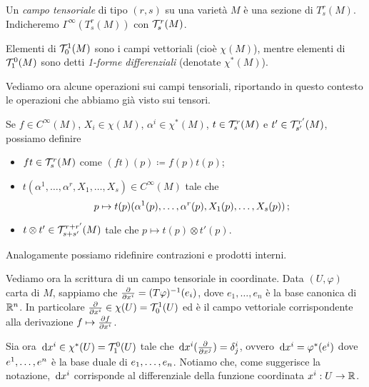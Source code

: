 \begin{definition} 
	Un \emph{campo tensoriale} di tipo $(r,s)$ su una varietà $M$ è una sezione di $T_s^r(M)$. Indicheremo $\Gamma^\infty(T_s^r(M))$ con $\Tau_s^r(M)$.
	
	Elementi di $\Tau_0^1(M)$ sono i campi vettoriali (cioè $\chi(M)$), mentre elementi di $\Tau_1^0(M)$ sono detti \emph{1-forme differenziali} (denotate $\chi^*(M)$). 
\end{definition}

Vediamo ora alcune operazioni sui campi tensoriali, riportando in questo contesto le operazioni che abbiamo già visto sui tensori. 

Se $f\in C^\infty(M)$, $X_i \in \chi(M)$, $\alpha^i \in \chi^*(M)$, $t \in \Tau_s^r(M)$ e $t' \in \Tau_{s'}^{r'}(M)$, possiamo definire
\begin{itemize}
	\item $ft \in \Tau_s^r(M)$ come $(ft)(p) \coloneqq f(p) t(p)$;
	\item $t(\alpha^1,\ldots,\alpha^r,X_1,\ldots, X_s)\in C^\infty(M)$ tale che
	\begin{equation*}
		p \mapsto t(p)(\alpha^1(p),\ldots,\alpha^r(p),X_1(p),\ldots, X_s(p)) \puntovirgola
	\end{equation*}
	
	\item $t\otimes t' \in \Tau_{s+s'}^{r+r'}(M)$ tale che $p \mapsto t(p)\otimes t'(p)$.
\end{itemize}
Analogamente possiamo ridefinire contrazioni e prodotti interni.

Vediamo ora la scrittura di un campo tensoriale in coordinate. Data $(U,\varphi)$ carta di $M$, sappiamo che $\DerParz{}{x^i} = (T\varphi)^{-1}(e_i)$, dove $e_1,\ldots, e_n$ è la base canonica di $\R^n$.
In particolare $\DerParz{}{x^i} \in \chi(U)=\Tau_0^1(U)$ ed è il campo vettoriale corrispondente alla derivazione $f \mapsto \DerParz{f}{x^i}$. 

Sia ora $\de x^i\in \chi^*(U) = \Tau_1^0(U)$ tale che $\de x^i(\DerParz{}{x^j}) = \delta^i_j$, ovvero $\de x^i = \varphi^*(e^i)$ dove $\seqa en,$ è la base duale di $\seqb en,$.
Notiamo che, come suggerisce la notazione, $\de x^i$ corrisponde al differenziale della funzione coordinata $x^i:U\to \R$.

